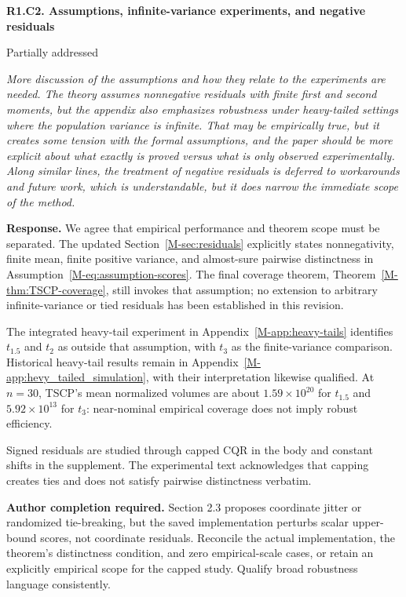 \documentclass[11pt]{article}
\newcommand{\mssec}[1]{Section~\ref*{M-#1}}
\newcommand{\msapp}[1]{Appendix~\ref*{M-#1}}
\newcommand{\action}[1]{\par{\small\color{ActionRed}\textbf{Author completion required.} #1\par}}
\newcommand{\point}[3]{\par\Needspace{7\baselineskip}\medskip
\noindent\parbox[t]{0.77\linewidth}{\textbf{#1}}\hfill
\parbox[t]{0.21\linewidth}{\raggedleft\small\sffamily #2}\par\nopagebreak
{\color{ReviewerBlue}\small\itshape #3\par}\textbf{Response.} }
\begin{document}
\point{R1.C2. Assumptions, infinite-variance experiments, and negative residuals}{Partially addressed}{More discussion of the assumptions and how they relate to the experiments
are needed. The theory assumes nonnegative residuals with finite first
and second moments, but the appendix also emphasizes robustness under
heavy-tailed settings where the population variance is infinite. That
may be empirically true, but it creates some tension with the formal
assumptions, and the paper should be more explicit about what exactly is
proved versus what is only observed experimentally. Along similar
lines, the treatment of negative residuals is deferred to workarounds
and future work, which is understandable, but it does narrow the
immediate scope of the method.}
\label{response:R1.C2}
We agree that empirical performance and theorem scope must be separated. The updated \mssec{sec:residuals} explicitly states nonnegativity, finite mean, finite positive variance, and almost-sure pairwise distinctness in Assumption~\ref*{M-eq:assumption-scores}. The final coverage theorem, Theorem~\ref*{M-thm:TSCP-coverage}, still invokes that assumption; no extension to arbitrary infinite-variance or tied residuals has been established in this revision.

The integrated heavy-tail experiment in \msapp{app:heavy-tails} identifies $t_{1.5}$ and $t_2$ as outside that assumption, with $t_3$ as the finite-variance comparison. Historical heavy-tail results remain in \msapp{app:hevy_tailed_simulation}, with their interpretation likewise qualified. At $n=30$, TSCP's mean normalized volumes are about $1.59\times10^{20}$ for $t_{1.5}$ and $5.92\times10^{13}$ for $t_3$: near-nominal empirical coverage does not imply robust efficiency.

Signed residuals are studied through capped CQR in the body and constant shifts in the supplement. The experimental text acknowledges that capping creates ties and does not satisfy pairwise distinctness verbatim.

\action{Section 2.3 proposes coordinate jitter or randomized tie-breaking, but the saved implementation perturbs scalar upper-bound scores, not coordinate residuals. Reconcile the actual implementation, the theorem's distinctness condition, and zero empirical-scale cases, or retain an explicitly empirical scope for the capped study. Qualify broad robustness language consistently.}
\end{document}
